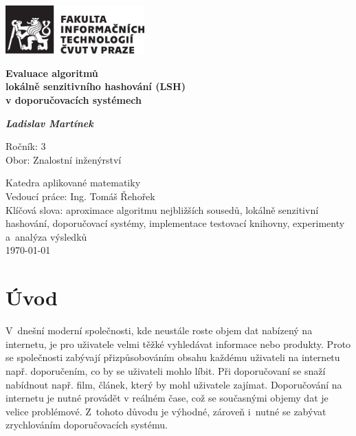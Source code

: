 \documentclass[11pt]{article}
\begin{document}
	\begin{titlepage}
	 \includegraphics[width=0.4\textwidth]{logo_FIT_cb}
		\begin{center}
        \vspace*{4.5cm}
        \huge
        \textbf{Evaluace algoritmů \\lokálně senzitivního hashování (LSH) \\v doporučovacích systémech}
        
        \vspace{3cm}
        \LARGE
        \textbf{ \textit{Ladislav Martínek}}

        \vfill
        \large
        
        Ročník: 3\\
        Obor: Znalostní inženýrství\\
        \vspace{0.5cm}
        
        Katedra aplikované matematiky\\
        Vedoucí práce: Ing. Tomáš Řehořek \\
        \vspace{2.5cm}
        Klíčová slova: aproximace algoritmu nejbližších sousedů, lokálně senzitivní hashování, doporučovací systémy, implementace testovací knihovny, experimenty a~analýza výsledků\\
        \vspace{0.5cm}
        \today
    \end{center}
 	\end{titlepage}
 
 

 
\section{Úvod} 
V~dnešní moderní společnosti, kde neustále roste objem dat nabízený na internetu,
je pro uživatele velmi těžké vyhledávat informace nebo produkty. Proto
se společnosti zabývají přizpůsobováním obsahu každému uživateli na internetu
např. doporučením, co by se uživateli mohlo líbit. Při doporučovaní se
snaží nabídnout např. film, článek, který by mohl uživatele zajímat. Doporučování
na internetu je nutné provádět v reálném čase, což se současnými
objemy dat je velice problémové. Z~tohoto důvodu je výhodné,
zároveň i~nutné se zabývat zrychlováním doporučovacích systému.
\end{document}
